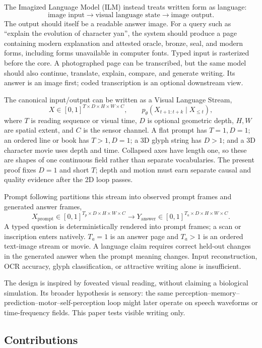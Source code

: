 \documentclass[11pt]{article}
\begin{document}
The Imagized Language Model (ILM) instead treats written form as language:
\[
\text{image input} \rightarrow \text{visual language state} \rightarrow \text{image output}.
\]
The output should itself be a readable answer image. For a query such as
``explain the evolution of character yan'', the system should produce a page
containing modern explanation and attested oracle, bronze, seal, and modern
forms, including forms unavailable in computer fonts. Typed input is rasterized
before the core. A photographed page can be transcribed, but the same model
should also continue, translate, explain, compare, and generate writing. Its
answer is an image first; coded transcription is an optional downstream view.

The canonical input/output can be written as a Visual Language Stream,
\[
X\in[0,1]^{T\times D\times H\times W\times C},
\qquad
p_\theta(X_{t+1:t+k}\mid X_{\leq t}),
\]
where $T$ is reading sequence or visual time, $D$ is optional geometric depth,
$H,W$ are spatial extent, and $C$ is the sensor channel. A flat prompt has
$T=1,D=1$; an ordered line or book has $T>1,D=1$; a 3D glyph string has
$D>1$; and a 3D character movie uses depth and time. Collapsed axes have length
one, so these are shapes of one continuous field rather than separate
vocabularies. The present proof fixes $D=1$ and short $T$; depth and motion must
earn separate causal and quality evidence after the 2D loop passes.

Prompt following partitions this stream into observed prompt frames and
generated answer frames,
\[
X_{\mathrm{prompt}}\in[0,1]^{T_p\times D\times H\times W\times C}
\longrightarrow
Y_{\mathrm{answer}}\in[0,1]^{T_a\times D\times H\times W\times C}.
\]
A typed question is deterministically rendered into prompt frames; a scan or
inscription enters natively. $T_a=1$ is an answer page and $T_a>1$ is an
ordered text-image stream or movie. A language claim requires correct held-out
changes in the generated answer when the prompt meaning changes. Input
reconstruction, OCR accuracy, glyph classification, or attractive writing
alone is insufficient.

The design is inspired by foveated visual reading, without claiming a biological
simulation. Its broader hypothesis is sensory: the same perception--memory--
prediction--motor--self-perception loop might later operate on speech waveforms
or time-frequency fields. This paper tests visible writing only.

\subsection{Contributions}
\end{document}
